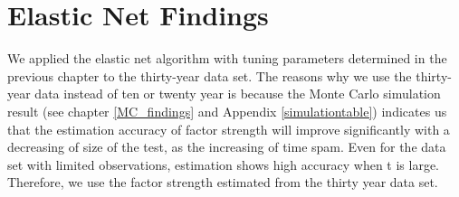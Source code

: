 \section{Elastic Net Findings}
We applied the elastic net algorithm with tuning parameters determined in the previous chapter to the thirty-year data set.
The reasons why we use the thirty-year data instead of ten or twenty year is because the Monte Carlo simulation result (see chapter \ref{MC_findings} and Appendix \ref{simulationtable}) indicates us that the estimation accuracy of factor strength will improve significantly with a decreasing of size of the test, as the increasing of time spam.
Even for the data set with limited observations, estimation shows high accuracy when t is large.
Therefore, we use the factor strength estimated from the thirty year data set.

